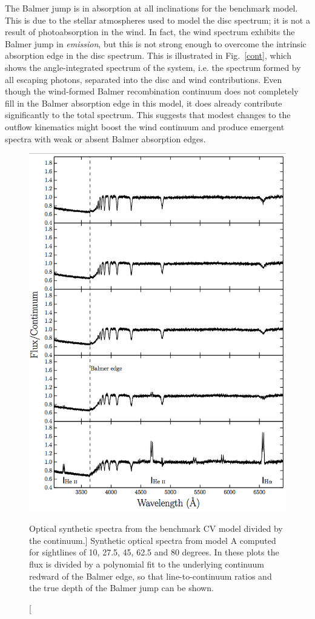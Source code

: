 The Balmer jump is in absorption at all inclinations for the benchmark
model. This is due to the stellar atmospheres used to
model the disc spectrum; it is not a result of photoabsorption in the
wind. In fact, the wind spectrum exhibits the Balmer jump in {\em
emission}, but this is not strong enough to overcome the intrinsic
absorption edge in the disc spectrum. This is illustrated in
Fig.~\ref{cont}, which shows the angle-integrated spectrum of the system,
i.e. the spectrum formed by all escaping photons, separated into the
disc and wind contributions. Even though the wind-formed Balmer
recombination continuum does not completely fill in the Balmer
absorption edge in this model, it does already contribute
significantly to the total spectrum. This suggests that modest changes 
to the outflow kinematics might boost the wind continuum and produce
emergent spectra with weak or absent Balmer absorption edges. 

\begin{figure}
\centering 
\includegraphics[width=1.0\textwidth]{figures/05-cvpaper/modela_opt_cont.png}
\caption
[Optical synthetic spectra from the benchmark CV model divided by the continuum.]
{Synthetic optical spectra from model A computed for 
sightlines of 10, 27.5, 45, 62.5 and 80 degrees. In these plots
the flux is divided by a polynomial fit to the 
underlying continuum redward of the Balmer edge, so that 
line-to-continuum ratios and the true depth of the
Balmer jump can be shown.}
\label{spec_continuum}
\end{figure} 

